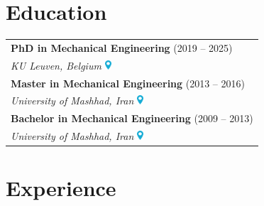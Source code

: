 \documentclass[lighthipster]{simplehipstercv}
\begin{document}
\begin{paracol}{2}
		\section*{Education}
		\vspace{-0.4cm}
		\begin{table}[h]
		 	\centering
		 	\begin{tabularx}{\linewidth}{X}
		 		\textbf{PhD in Mechanical Engineering} (2019 -- 2025) \\
		 		\textit{KU Leuven, Belgium} \includegraphics[height=0.35cm]{files/location.pdf} \\[0.4cm]
		 		
		 		\textbf{Master in Mechanical Engineering} (2013 -- 2016) \\
		 		\textit{University of Mashhad, Iran} \includegraphics[height=0.35cm]{files/location.pdf} \\[0.4cm]
		 		
		 		\textbf{Bachelor in Mechanical Engineering} (2009 -- 2013) \\
		 		\textit{University of Mashhad, Iran} \includegraphics[height=0.35cm]{files/location.pdf} \\
		 	\end{tabularx}
		\end{table}
		\vspace{-0.6cm}
		 
		 
		\section*{Experience}
		\vspace{-0.4cm}
		

\end{paracol}
\end{document}
